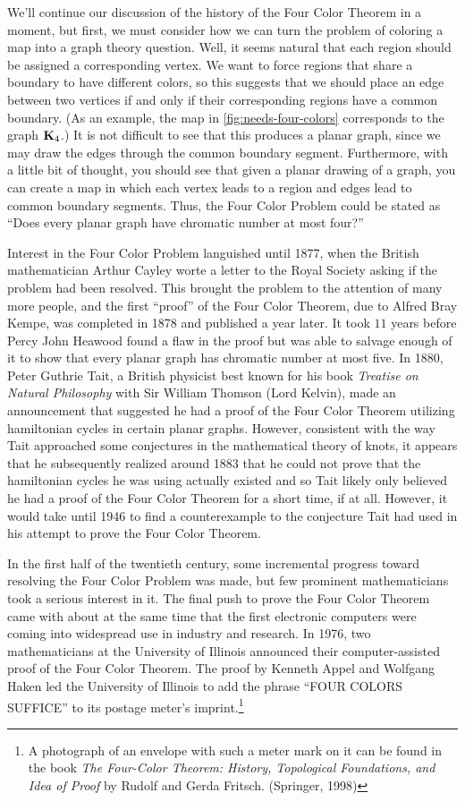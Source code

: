 We'll continue our discussion of the history of the Four Color Theorem
in a moment, but first, we must consider how we can turn the problem
of coloring a map into a graph theory question. Well, it seems natural
that each region should be assigned a corresponding vertex. We want to
force regions that share a boundary to have different colors, so this
suggests that we should place an edge between two vertices if and only
if their corresponding regions have a common boundary. (As an example,
the map in \autoref{fig:needs-four-colors} corresponds to the graph
$\mathbf{K}_4$.) It is not difficult to see that this produces a planar
graph, since we may draw the edges through the common boundary
segment. Furthermore, with a little bit of thought, you should see
that given a planar drawing of a graph, you can create a map in which
each vertex leads to a region and edges lead to common boundary
segments. Thus, the Four Color Problem could be stated as ``Does every
planar graph have chromatic number at most four?''

Interest in the Four Color Problem languished until 1877, when the
British mathematician Arthur Cayley worte a letter to the Royal
Society asking if the problem had been resolved. This brought the
problem to the attention of many more people, and the first ``proof''
of the Four Color Theorem, due to Alfred Bray Kempe, was completed in
1878 and published a year later. It took $11$ years before Percy John
Heawood found a flaw in the proof but was able to salvage enough of it
to show that every planar graph has chromatic number at most five. In
1880, Peter Guthrie Tait, a British physicist best known for his book
\textit{Treatise on Natural Philosophy} with Sir William Thomson (Lord
Kelvin), made an announcement that suggested he had a proof of the
Four Color Theorem utilizing hamiltonian cycles in certain planar
graphs. However, consistent with the way Tait approached some
conjectures in the mathematical theory of knots, it appears that he
subsequently realized around 1883 that he could not prove that the
hamiltonian cycles he was using actually existed and so Tait likely
only believed he had a proof of the Four Color Theorem for a short
time, if at all. However, it would take until 1946 to find a
counterexample to the conjecture Tait had used in his attempt to prove
the Four Color Theorem.

In the first half of the twentieth century, some incremental progress
toward resolving the Four Color Problem was made, but few prominent
mathematicians took a serious interest in it. The final push to prove
the Four Color Theorem came with about at the same time that
the first electronic computers were coming into widespread use in
industry and research. In 1976, two mathematicians at the University
of Illinois announced their computer-assisted proof of the Four Color
Theorem. The proof by Kenneth Appel and Wolfgang Haken led the
University of Illinois to add the phrase ``FOUR COLORS
SUFFICE'' to its postage meter's imprint.\footnote{A photograph of an envelope with such a meter mark
  on it can be found in the book \textit{The Four-Color Theorem:
    History, Topological Foundations, and Idea of Proof} by Rudolf and
  Gerda Fritsch. (Springer, 1998)}

